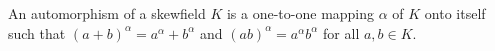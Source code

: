 An automorphism of a skewfield $K$ is a one-to-one mapping $\alpha$ of $K$ onto itself such that $(a+b)^\alpha = a^\alpha + b^\alpha$ and $(ab)^\alpha = a^\alpha b^\alpha$ for all $a, b \in K$.
